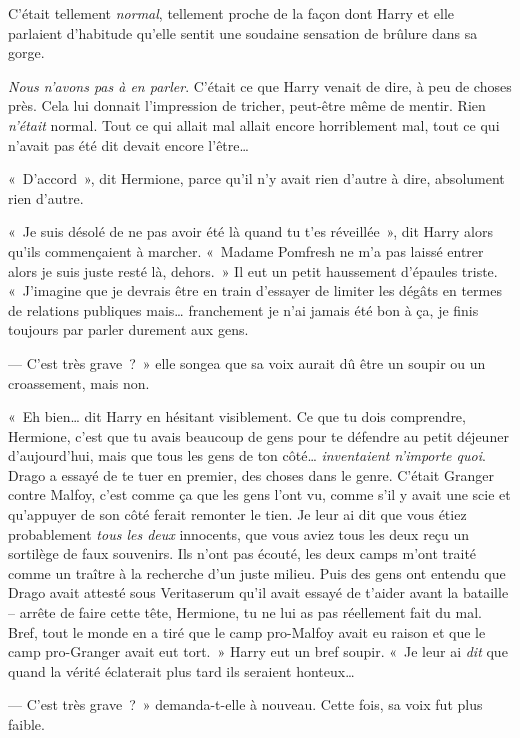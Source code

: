 C'était tellement \emph{normal}, tellement proche de la façon dont Harry et elle parlaient d'habitude qu'elle sentit une soudaine sensation de brûlure dans sa gorge.

\emph{Nous n'avons pas à en parler}. C'était ce que Harry venait de dire, à peu de choses près. Cela lui donnait l'impression de tricher, peut-être même de mentir. Rien \emph{n'était} normal. Tout ce qui allait mal allait encore horriblement mal, tout ce qui n'avait pas été dit devait encore l'être…

«~D'accord~», dit Hermione, parce qu'il n'y avait rien d'autre à dire, absolument rien d'autre.

«~Je suis désolé de ne pas avoir été là quand tu t'es réveillée~», dit Harry alors qu'ils commençaient à marcher. «~Madame Pomfresh ne m'a pas laissé entrer alors je suis juste resté là, dehors.~» Il eut un petit haussement d'épaules triste. «~J'imagine que je devrais être en train d'essayer de limiter les dégâts en termes de relations publiques mais… franchement je n'ai jamais été bon à ça, je finis toujours par parler durement aux gens.

--- C'est très grave~?~» elle songea que sa voix aurait dû être un soupir ou un croassement, mais non.

«~Eh bien… dit Harry en hésitant visiblement. Ce que tu dois comprendre, Hermione, c'est que tu avais beaucoup de gens pour te défendre au petit déjeuner d'aujourd'hui, mais que tous les gens de ton côté… \emph{inventaient n'importe quoi}. Drago a essayé de te tuer en premier, des choses dans le genre. C'était Granger contre Malfoy, c'est comme ça que les gens l'ont vu, comme s'il y avait une scie et qu'appuyer de son côté ferait remonter le tien. Je leur ai dit que vous étiez probablement \emph{tous les deux} innocents, que vous aviez tous les deux reçu un sortilège de faux souvenirs. Ils n'ont pas écouté, les deux camps m'ont traité comme un traître à la recherche d'un juste milieu. Puis des gens ont entendu que Drago avait attesté sous Veritaserum qu'il avait essayé de t'aider avant la bataille -- arrête de faire cette tête, Hermione, tu ne lui as pas réellement fait du mal. Bref, tout le monde en a tiré que le camp pro-Malfoy avait eu raison et que le camp pro-Granger avait eut tort.~» Harry eut un bref soupir. «~Je leur ai \emph{dit} que quand la vérité éclaterait plus tard ils seraient honteux…

--- C'est très grave~?~» demanda-t-elle à nouveau. Cette fois, sa voix fut plus faible.

